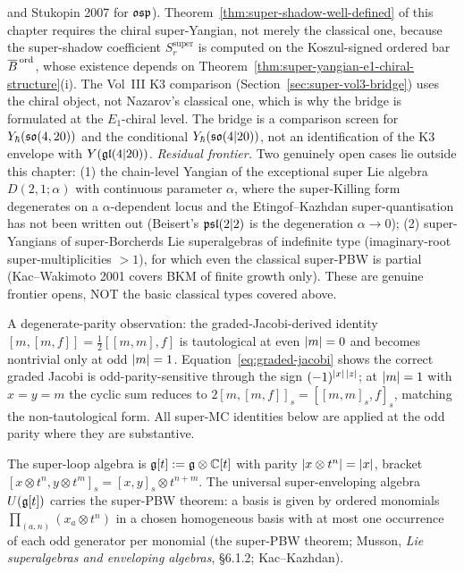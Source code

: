 \begin{remark}
and Stukopin 2007 for $\mathfrak{osp}$). Theorem~\ref{thm:super-shadow-well-defined}
of this chapter requires the chiral super-Yangian, not merely the
classical one, because the super-shadow coefficient
$S_r^{\mathrm{super}}$ is computed on the Koszul-signed ordered bar
$\overline{B}^{\,\mathrm{ord}}$, whose existence depends on
Theorem~\ref{thm:super-yangian-e1-chiral-structure}(i). The Vol~III
K3 comparison
(Section~\ref{sec:super-vol3-bridge}) uses the chiral object, not
Nazarov's classical one, which is why the bridge is formulated at the
$E_1$-chiral level. The bridge is a comparison screen for
$Y_{\hbar}(\mathfrak{so}(4,20))$ and the conditional
$Y_{\hbar}(\mathfrak{so}(4|20))$, not an identification of the K3 envelope with
$Y(\mathfrak{gl}(4|20))$.
\emph{Residual frontier.} Two genuinely open cases lie outside this
chapter: (1) the chain-level Yangian of the exceptional super Lie
algebra $D(2,1;\alpha)$ with continuous parameter $\alpha$, where the
super-Killing form degenerates on a $\alpha$-dependent locus and the
Etingof--Kazhdan super-quantisation has not been written out (Beisert's
$\mathfrak{psl}(2|2)$ is the degeneration $\alpha\to 0$); (2) super-Yangians of
super-Borcherds Lie superalgebras of indefinite type (imaginary-root
super-multiplicities $> 1$), for which even the classical super-PBW is
partial (Kac--Wakimoto 2001 covers BKM of finite growth only). These
are genuine frontier opens, NOT the basic classical types covered above.
\end{remark}

\begin{remark}
\label{rem:ap138-absorbed}
A degenerate-parity observation: the graded-Jacobi-derived identity
$[m,[m,f]]=\tfrac12[[m,m],f]$ is tautological at even
$|m|=0$ and becomes nontrivial only at odd $|m|=1$.
Equation~\eqref{eq:graded-jacobi} shows the correct graded Jacobi is
odd-parity-sensitive through the sign
$(-1)^{|x|\,|z|}$; at $|m|=1$ with $x=y=m$ the
cyclic sum reduces to $2[m,[m,f]]_s=[[m,m]_s,f]_s$, matching the
non-tautological form. All super-MC identities below are applied at the
odd parity where they are substantive.
\end{remark}

The super-loop algebra is $\mathfrak{g}[t] := \mathfrak{g}\otimes\mathbb{C}[t]$ with
parity $|x\otimes t^n|=|x|$, bracket
$[x\otimes t^n, y\otimes t^m]_s = [x,y]_s\otimes t^{n+m}$. The universal
super-enveloping algebra $U(\mathfrak{g}[t])$ carries the super-PBW theorem: a
basis is given by ordered monomials $\prod_{(a,n)} (x_a\otimes t^n)$ in
a chosen homogeneous basis with at most one occurrence of each odd
generator per monomial (the super-PBW theorem; Musson,
\emph{Lie superalgebras and enveloping algebras}, \S6.1.2; Kac--Kazhdan).

